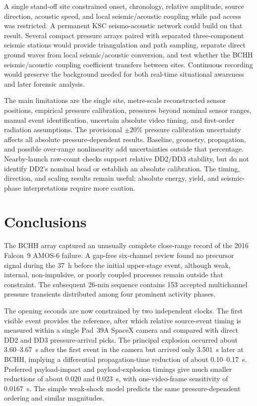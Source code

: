 \documentclass[]{seismica}
\begin{document}
A single stand-off site constrained onset, chronology, relative amplitude,
source direction, acoustic speed, and local seismic/acoustic coupling while pad
access was restricted. A permanent KSC seismo-acoustic network could build on
that result. Several compact pressure arrays paired with separated
three-component seismic stations would provide triangulation and path sampling,
separate direct ground waves from local seismic/acoustic conversion, and test
whether the BCHH seismic/acoustic coupling coefficient transfers between sites. Continuous
recording would preserve the background needed for both real-time situational
awareness and later forensic analysis.

The main limitations are the single site, metre-scale reconstructed sensor
positions, empirical pressure calibration, pressures beyond nominal sensor
ranges, manual event identification, uncertain absolute video timing, and
first-order radiation assumptions. The provisional $\pm20\%$ pressure
calibration uncertainty affects all absolute pressure-dependent results.
Baseline, geometry, propagation, and possible over-range nonlinearity add
uncertainties outside that percentage. Nearby-launch raw-count checks support
relative DD2/DD3 stability, but do not identify DD2's nominal head or establish
an absolute calibration. The timing, direction, and scaling results remain
useful; absolute energy, yield, and seismic-phase interpretations require more
caution.


\section{Conclusions}
\label{sec:conclusions}

The BCHH array captured an unusually complete close-range record of the 2016
Falcon~9 AMOS-6 failure. A gap-free six-channel review found no precursor
signal during the 37~h before the initial upper-stage event, although weak,
internal, non-impulsive, or poorly coupled processes remain outside that
constraint. The subsequent 26-min sequence contains 153 accepted multichannel
pressure transients distributed among four prominent activity phases.

The opening seconds are now constrained by two independent clocks. The first
visible event provides the reference, after which relative source-event timing
is measured within a single Pad~39A SpaceX camera and compared with direct DD2
and DD3 pressure-arrival picks. The principal explosion occurred about
3.60--3.67~s after the first event in the camera but arrived only 3.501~s later
at BCHH, implying a differential propagation-time reduction of about
0.10--0.17~s. Preferred payload-impact and payload-explosion timings give much
smaller reductions of about 0.020 and 0.023~s, with one-video-frame sensitivity
of 0.0167~s. The simple weak-shock model predicts the same pressure-dependent
ordering and similar magnitudes.
\end{document}

